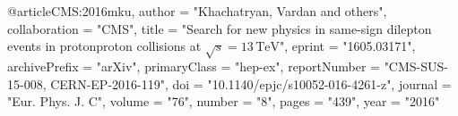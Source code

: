 @article{CMS:2016mku,
    author = "Khachatryan, Vardan and others",
    collaboration = "CMS",
    title = "{Search for new physics in same-sign dilepton events in proton\textendash{}proton collisions at $\sqrt{s} = 13\,\text {TeV} $}",
    eprint = "1605.03171",
    archivePrefix = "arXiv",
    primaryClass = "hep-ex",
    reportNumber = "CMS-SUS-15-008, CERN-EP-2016-119",
    doi = "10.1140/epjc/s10052-016-4261-z",
    journal = "Eur. Phys. J. C",
    volume = "76",
    number = "8",
    pages = "439",
    year = "2016"
}

